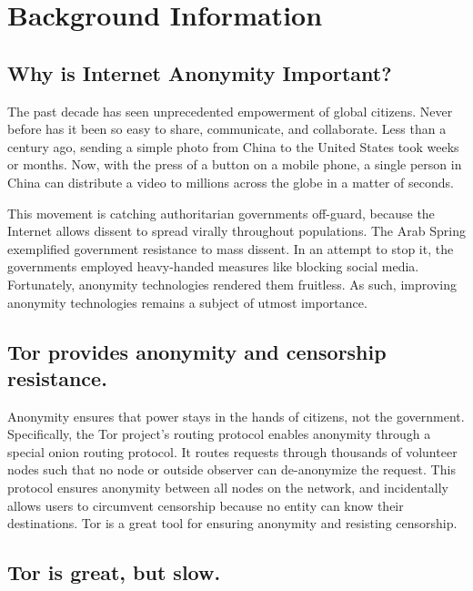 \section{Background Information}

\subsection{Why is Internet Anonymity Important?}

The past decade has seen unprecedented empowerment of global citizens. Never before has it been so easy to share, communicate, and collaborate. Less than a century ago, sending a simple photo from China to the United States took weeks or months. Now, with the press of a button on a mobile phone, a single person in China can distribute a video to millions across the globe in a matter of seconds.

This movement is catching authoritarian governments off-guard, because the Internet allows dissent to spread virally throughout populations. The Arab Spring exemplified government resistance to mass dissent. In an attempt to stop it, the governments employed heavy-handed measures like blocking social media. Fortunately, anonymity technologies rendered them fruitless. As such, improving anonymity technologies remains a subject of utmost importance.

\subsection{Tor provides anonymity and censorship resistance.}

Anonymity ensures that power stays in the hands of citizens, not the government. Specifically, the Tor project's routing protocol enables anonymity through a special onion routing protocol. It routes requests through thousands of volunteer nodes such that no node or outside observer can de-anonymize the request. This protocol ensures anonymity between all nodes on the network, and incidentally allows users to circumvent censorship because no entity can know their destinations. Tor is a great tool for ensuring anonymity and resisting censorship.

\subsection{Tor is great, but slow.}

